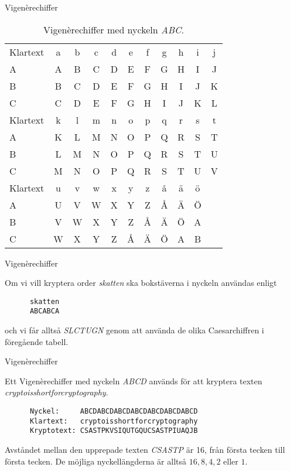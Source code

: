 \documentclass{beamer}
\theoremstyle{definition}
\begin{document}
\begin{frame}{\insertsubsectionhead}{Vigenèrechiffer}
  \begin{table}
    \centering
    \begin{tabular}{l|cccccccccc}
      \toprule
      Klartext & a & b & c & d & e & f & g & h & i & j \\
      A        & A & B & C & D & E & F & G & H & I & J \\
      B        & B & C & D & E & F & G & H & I & J & K \\
      C        & C & D & E & F & G & H & I & J & K & L \\
      \midrule
      Klartext & k & l & m & n & o & p & q & r & s & t \\
      A        & K & L & M & N & O & P & Q & R & S & T \\
      B        & L & M & N & O & P & Q & R & S & T & U \\
      C        & M & N & O & P & Q & R & S & T & U & V \\
      \midrule
      Klartext & u & v & w & x & y & z & å & ä & ö \\
      A        & U & V & W & X & Y & Z & Å & Ä & Ö \\
      B        & V & W & X & Y & Z & Å & Ä & Ö & A \\
      C        & W & X & Y & Z & Å & Ä & Ö & A & B \\
      \bottomrule
    \end{tabular}
    \caption{Vigenèrechiffer med nyckeln \emph{ABC}.}
    \label{tbl:Vigenerechiffer}
  \end{table}
\end{frame}

\begin{frame}[fragile]{\insertsubsectionhead}{Vigenèrechiffer}
  \begin{example}
    \label{ex:VigenereSkatten}
    Om vi vill kryptera order \emph{skatten} ska bokstäverna i nyckeln användas 
    enligt
    \begin{verbatim}
      skatten
      ABCABCA
    \end{verbatim}
    och vi får alltså \emph{SLCTUGN} genom att använda de olika Caesarchiffren 
    i föregående tabell.
  \end{example}
\end{frame}

\begin{frame}[fragile]{\insertsubsectionhead}{Vigenèrechiffer}
  \begin{example}
    \label{ex:VigenereMedUpprepning}
    Ett Vigenèrechiffer med nyckeln \emph{ABCD} används för att kryptera texten 
    \emph{cryptoisshortforcryptography}.
    \begin{verbatim}
      Nyckel:     ABCDABCDABCDABCDABCDABCDABCD
      Klartext:   cryptoisshortforcryptography
      Kryptotext: CSASTPKVSIQUTGQUCSASTPIUAQJB
    \end{verbatim}
    Avståndet mellan den upprepade texten \emph{CSASTP} är 16, från första 
    tecken till första tecken.
    De möjliga nyckellängderna är alltså \(16, 8, 4, 2\) eller \(1\).
  \end{example}
\end{frame}
\end{document}

